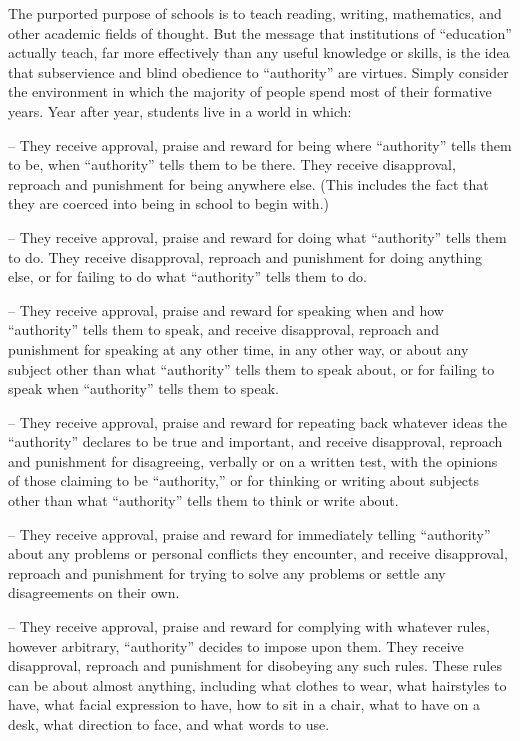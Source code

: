 \documentclass{book}
\begin{document}
The purported purpose of schools is to teach reading, writing, mathematics, and other academic fields of thought. But the message that institutions of \enquote{education} actually teach, far more effectively than any useful knowledge or skills, is the idea that subservience and blind obedience to \enquote{authority} are virtues. Simply consider the environment in which the majority of people spend most of their formative years. Year after year, students live in a world in which:

-- They receive approval, praise and reward for being where \enquote{authority} tells them to be, when \enquote{authority} tells them to be there. They receive disapproval, reproach and punishment for being anywhere else. (This includes the fact that they are coerced into being in school to begin with.)

-- They receive approval, praise and reward for doing what \enquote{authority} tells them to do. They receive disapproval, reproach and punishment for doing anything else, or for failing to do what \enquote{authority} tells them to do.

-- They receive approval, praise and reward for speaking when and how \enquote{authority} tells them to speak, and receive disapproval, reproach and punishment for speaking at any other time, in any other way, or about any subject other than what \enquote{authority} tells them to speak about, or for failing to speak when \enquote{authority} tells them to speak.

-- They receive approval, praise and reward for repeating back whatever ideas the \enquote{authority} declares to be true and important, and receive disapproval, reproach and punishment for disagreeing, verbally or on a written test, with the opinions of those claiming to be \enquote{authority,} or for thinking or writing about subjects other than what \enquote{authority} tells them to think or write about.

-- They receive approval, praise and reward for immediately telling \enquote{authority} about any problems or personal conflicts they encounter, and receive disapproval, reproach and punishment for trying to solve any problems or settle any disagreements on their own.

-- They receive approval, praise and reward for complying with whatever rules, however arbitrary, \enquote{authority} decides to impose upon them. They receive disapproval, reproach and punishment for disobeying any such rules. These rules can be about almost anything, including what clothes to wear, what hairstyles to have, what facial expression to have, how to sit in a chair, what to have on a desk, what direction to face, and what words to use.
\end{document}

